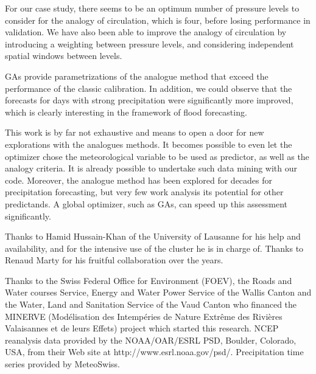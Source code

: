 \documentclass[twocol]{ametsoc}
\begin{document}
For our case study, there seems to be an optimum number of pressure levels to consider for the analogy of circulation, which is four, before losing performance in validation. We have also been able to improve the analogy of circulation by introducing a weighting between pressure levels, and considering independent spatial windows between levels.

GAs provide parametrizations of the analogue method that exceed the performance of the classic calibration. In addition, we could observe that the forecasts for days with strong precipitation were significantly more improved, which is clearly interesting in the framework of flood forecasting.

This work is by far not exhaustive and means to open a door for new explorations with the analogues methods. It becomes possible to even let the optimizer chose the meteorological variable to be used as predictor, as well as the analogy criteria. It is already possible to undertake such data mining with our code. Moreover, the analogue method has been explored for decades for precipitation forecasting, but very few work analysis its potential for other predictands. A global optimizer, such as GAs, can speed up this assessment significantly.




%
\acknowledgments
Thanks to Hamid Hussain-Khan of the University of Lausanne for his help and availability, and for the intensive use of the cluster he is in charge of. Thanks to Renaud Marty for his fruitful collaboration over the years.

Thanks to the Swiss Federal Office for Environment (FOEV), the Roads and Water courses Service, Energy and Water Power Service of the Wallis Canton and the Water, Land and Sanitation Service of the Vaud Canton who financed the MINERVE (Mod\'{e}lisation des Intemp\'{e}ries de Nature Extr\^{e}me des Rivi\`{e}res Valaisannes et de leurs Effets) project which started this research. NCEP reanalysis data provided by the NOAA/OAR/ESRL PSD, Boulder, Colorado, USA, from their Web site at http://www.esrl.noaa.gov/psd/. Precipitation time series provided by MeteoSwiss. 


%
\end{document}

